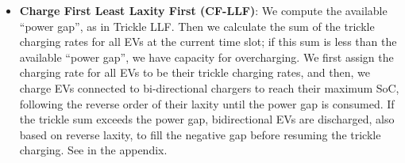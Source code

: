 \begin{itemize}[leftmargin=*]
    \item {\bf Charge First Least Laxity First (CF-LLF)}: We compute the available ``power gap'', as in Trickle LLF. 
    Then we calculate the sum of the trickle charging rates for all EVs at the current time slot; if this sum is less than the available ``power gap'', we have capacity for overcharging.  We first assign the charging rate for all EVs to be their trickle charging rates, and then, we charge EVs connected to bi-directional chargers to reach their maximum SoC, following the reverse order of their laxity until the power gap is consumed. 
    If the trickle sum exceeds the power gap, bidirectional EVs are discharged, also based on reverse laxity, to fill the negative gap before resuming the trickle charging.  See  in the appendix.

\end{itemize}
